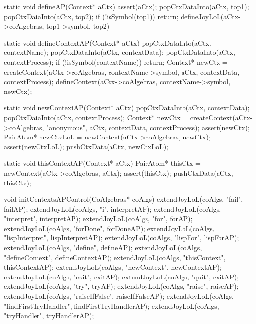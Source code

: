 static void defineAP(Context* aCtx) {
  assert(aCtx);
  popCtxDataInto(aCtx, top1);
  popCtxDataInto(aCtx, top2);
  if (!isSymbol(top1)) return;
  defineJoyLoL(aCtx->coAlgebras, top1->symbol, top2);
}

static void defineContextAP(Context* aCtx) {
  popCtxDataInto(aCtx, contextName);
  popCtxDataInto(aCtx, contextData);
  popCtxDataInto(aCtx, contextProcess);
  if (!isSymbol(contextName)) return;
  Context* newCtx =
    createContext(aCtx->coAlgebras, contextName->symbol,
                  aCtx, contextData, contextProcess);
  defineContext(aCtx->coAlgebras, contextName->symbol, newCtx);
}

static void newContextAP(Context* aCtx) {
  popCtxDataInto(aCtx, contextData);
  popCtxDataInto(aCtx, contextProcess);
  Context* newCtx =
    createContext(aCtx->coAlgebras, "anonymous",
                  aCtx, contextData, contextProcess);
  assert(newCtx);
  PairAtom* newCtxLoL = newContext(aCtx->coAlgebras, newCtx);
  assert(newCtxLoL);
  pushCtxData(aCtx, newCtxLoL);
}

static void thisContextAP(Context* aCtx) {
  PairAtom* thisCtx = newContext(aCtx->coAlgebras, aCtx);
  assert(thisCtx);
  pushCtxData(aCtx, thisCtx);
}

void initContextsAPControl(CoAlgebras* coAlgs) {
  extendJoyLoL(coAlgs, "fail",                failAP);
  extendJoyLoL(coAlgs, "i",                   interpretAP);
  extendJoyLoL(coAlgs, "interpret",           interpretAP);
  extendJoyLoL(coAlgs, "for",                 forAP);
  extendJoyLoL(coAlgs, "forDone",             forDoneAP);
  extendJoyLoL(coAlgs, "lispInterpret",       lispInterpretAP);
  extendJoyLoL(coAlgs, "lispFor",             lispForAP);
  extendJoyLoL(coAlgs, "define",              defineAP);
  extendJoyLoL(coAlgs, "defineContext",       defineContextAP);
  extendJoyLoL(coAlgs, "thisContext",         thisContextAP);
  extendJoyLoL(coAlgs, "newContext",          newContextAP);
  extendJoyLoL(coAlgs, "exit",                exitAP);
  extendJoyLoL(coAlgs, "quit",                exitAP);
  extendJoyLoL(coAlgs, "try",                 tryAP);
  extendJoyLoL(coAlgs, "raise",               raiseAP);
  extendJoyLoL(coAlgs, "raiseIfFalse",        raiseIfFalseAP);
  extendJoyLoL(coAlgs, "findFirstTryHandler", findFirstTryHandlerAP);
  extendJoyLoL(coAlgs, "tryHandler",          tryHandlerAP);
}
\stoptyping